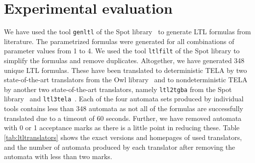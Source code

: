 \documentclass[a4paper,UKenglish,cleveref,autoref,thm-restate]{lipics-v2021}
\def\false{\mathit{false}}
\def\true{\mathit{true}}
\begin{document}






\section{Experimental evaluation}\label{sec:experiments}

We have used the tool \texttt{genltl} of the Spot
library~\cite{duret.16.atva2} to generate LTL formulas from
literature. The parametrized formulas were generated for all
combinations of parameter values from 1 to 4. We used the tool
\texttt{ltlfilt} of the Spot library to simplify the formulas and
remove duplicates. Altogether, we have generated 348 unique LTL
formulas. These have been translated to deterministic TELA by two
state-of-the-art translators from the Owl
library~\cite{kretinsky.18.atva} and to nondeterministic TELA by
another two state-of-the-art translators, namely \texttt{ltl2tgba}
from the Spot library~\cite{duret.16.atva2} and
\texttt{ltl3tela}~\cite{major.19.atva}. Each of the four automata sets
produced by individual tools contains less than 348 automata as not all
of the formulas are successfully translated due to a timeout of 60
seconds. Further, we have removed automata with 0 or 1 acceptance
marks as there is a little point in reducing these. Table
\ref{tab:ltltranslators} shows the exact versions and homepages of
used translators, and the number of automata produced by each
translator after removing the automata with less than two marks.
\end{document}
